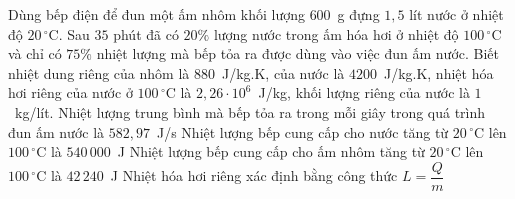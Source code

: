 	\begin{ex}%
		Dùng bếp điện để đun một ấm nhôm khối lượng $600$~g đựng $1{,}5$ lít nước ở nhiệt độ $20\,^\circ\text{C}$. Sau $35$ phút đã có $20\%$ lượng nước trong ấm hóa hơi ở nhiệt độ $100\,^\circ\text{C}$ và chỉ có $75\%$ nhiệt lượng mà bếp tỏa ra được dùng vào việc đun ấm nước. Biết nhiệt dung riêng của nhôm là $880$~J/kg.K, của nước là $4200$~J/kg.K, nhiệt hóa hơi riêng của nước ở $100\,^\circ\text{C}$ là $2{,}26\cdot 10^6$~J/kg, khối lượng riêng của nước là $1$~kg/lít.
		\choiceTFt
		{Nhiệt lượng trung bình mà bếp tỏa ra trong mỗi giây trong quá trình đun ấm nước là $582{,}97$~J/s}
		{Nhiệt lượng bếp cung cấp cho nước tăng từ $20\,^\circ\text{C}$ lên $100\,^\circ\text{C}$ là $540\,000$~J}
		{\True Nhiệt lượng bếp cung cấp cho ấm nhôm tăng từ $20\,^\circ\text{C}$ lên $100\,^\circ\text{C}$ là $42\,240$~J}
		{\True Nhiệt hóa hơi riêng xác định bằng công thức $L=\dfrac{Q}{m}$}
	\end{ex}

